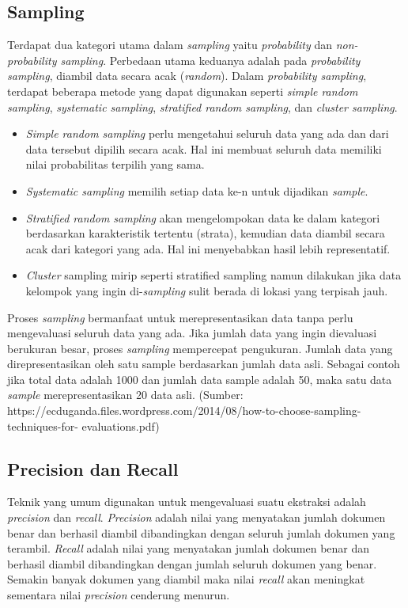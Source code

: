 \subsection{Sampling}
Terdapat dua kategori utama dalam \textit{sampling} yaitu \textit{probability} dan \textit{non-probability sampling}. Perbedaan utama keduanya adalah pada \textit{probability sampling}, diambil data secara acak (\textit{random}). Dalam \textit{probability sampling}, terdapat beberapa metode yang dapat digunakan seperti \textit{simple random sampling}, \textit{systematic sampling}, \textit{stratified random sampling}, dan \textit{cluster sampling}.
\begin{itemize}
  \item \textit{Simple random sampling} perlu mengetahui seluruh data yang ada dan dari data tersebut dipilih secara acak. Hal ini membuat seluruh data memiliki nilai probabilitas terpilih yang sama. 
  \item \textit{Systematic sampling} memilih setiap data ke-n untuk dijadikan \textit{sample}. 
  \item \textit{Stratified random sampling} akan mengelompokan data ke dalam kategori berdasarkan karakteristik tertentu (strata), kemudian data diambil secara acak dari kategori yang ada. Hal ini menyebabkan hasil lebih representatif. 
  \item \textit{Cluster} sampling mirip seperti stratified sampling namun dilakukan jika data kelompok yang ingin di-\textit{sampling} sulit berada di lokasi yang terpisah jauh.
\end{itemize}
Proses \textit{sampling} bermanfaat untuk merepresentasikan data tanpa perlu mengevaluasi seluruh data yang ada. Jika jumlah data yang ingin dievaluasi berukuran besar, proses \textit{sampling} mempercepat pengukuran. Jumlah data yang direpresentasikan oleh satu sample berdasarkan jumlah data asli. Sebagai contoh jika total data adalah 1000 dan jumlah data sample adalah 50, maka satu data \textit{sample} merepresentasikan 20 data asli.
(Sumber: https://ecduganda.files.wordpress.com/2014/08/how-to-choose-sampling-techniques-for-
evaluations.pdf)

\subsection{Precision dan Recall}
Teknik yang umum digunakan untuk mengevaluasi suatu ekstraksi adalah \textit{precision} dan \textit{recall}. \textit{Precision} adalah nilai yang menyatakan jumlah dokumen benar dan berhasil diambil dibandingkan dengan seluruh jumlah dokumen yang terambil. \textit{Recall} adalah nilai yang menyatakan jumlah dokumen benar dan berhasil diambil dibandingkan dengan jumlah seluruh dokumen yang benar. Semakin banyak dokumen yang diambil maka nilai \textit{recall} akan meningkat sementara nilai \textit{precision} cenderung menurun. 

